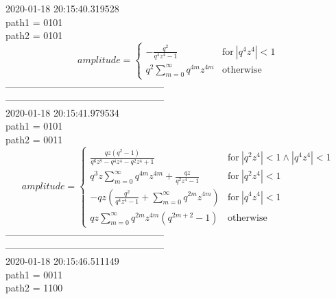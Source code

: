 \documentclass{jsreport}
\begin{document}
2020-01-18 20:15:40.319528\\
path1 = 0101\\
path2 = 0101\\
$$amplitude = \begin{cases} - \frac{q^{2}}{q^{4} z^{4} - 1} & \text{for}\: \left|{q^{4} z^{4}}\right| < 1 \\q^{2} \sum_{m=0}^{\infty} q^{4 m} z^{4 m} & \text{otherwise} \end{cases}$$
--------------------------------------------------\\
--------------------------------------------------\\
2020-01-18 20:15:41.979534\\
path1 = 0101\\
path2 = 0011\\
$$amplitude = \begin{cases} \frac{q z \left(q^{2} - 1\right)}{q^{6} z^{8} - q^{4} z^{4} - q^{2} z^{4} + 1} & \text{for}\: \left|{q^{2} z^{4}}\right| < 1 \wedge \left|{q^{4} z^{4}}\right| < 1 \\q^{3} z \sum_{m=0}^{\infty} q^{4 m} z^{4 m} + \frac{q z}{q^{2} z^{4} - 1} & \text{for}\: \left|{q^{2} z^{4}}\right| < 1 \\- q z \left(\frac{q^{2}}{q^{4} z^{4} - 1} + \sum_{m=0}^{\infty} q^{2 m} z^{4 m}\right) & \text{for}\: \left|{q^{4} z^{4}}\right| < 1 \\q z \sum_{m=0}^{\infty} q^{2 m} z^{4 m} \left(q^{2 m + 2} - 1\right) & \text{otherwise} \end{cases}$$
--------------------------------------------------\\
--------------------------------------------------\\
2020-01-18 20:15:46.511149\\
path1 = 0011\\
path2 = 1100\\
\end{document}
